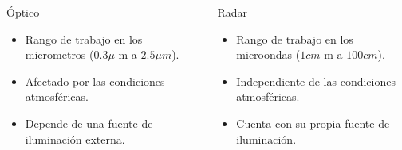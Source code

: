 \begin{frame}{} \vskip0cm
\begin{columns}
  \begin{column}{0.5\textwidth}
   \begin{block}{Óptico}
     \begin{itemize}
       \item Rango de trabajo en los micrometros ($0.3\mu$ m a $2.5\mu m$).
       \item Afectado por las condiciones atmosféricas.
       \item Depende de una fuente de iluminación externa.
     \end{itemize}
   \end{block}
  \end{column}
  \begin{column}{0.5\textwidth}  %
    \begin{block}{Radar}
      \begin{itemize}
        \item Rango de trabajo en los microondas ($1cm$ m a $100cm$).
        \item Independiente de las condiciones atmosféricas.
        \item Cuenta con su propia fuente de iluminación.
      \end{itemize}
    \end{block}
  \end{column}
  \end{columns}
\end{frame}

